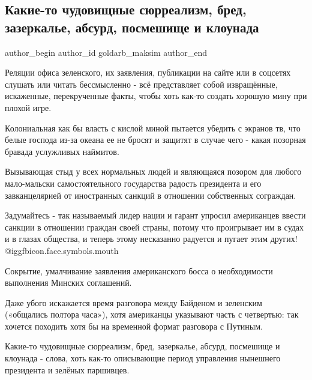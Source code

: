  
 
 
 
 
 
\subsection{Какие-то чудовищные сюрреализм, бред, зазеркалье, абсурд, посмешище и клоунада}
\label{sec:10_12_2021.fb.goldarb_maksim.1.klounada_sjurrealizm}
 
\ifcmt
 author_begin
   author_id goldarb_maksim
 author_end
\fi

Реляции офиса зеленского, их заявления, публикации на сайте или в соцсетях
слушать или читать бессмысленно - всё представляет собой извращённые,
искаженные, перекрученные факты, чтобы хоть как-то создать хорошую мину при
плохой игре. 


Колониальная как бы власть с кислой миной пытается убедить с экранов тв, что
белые господа из-за океана ее не бросят и защитят в случае чего - какая
позорная бравада услужливых наймитов. 

Вызывающая стыд у всех нормальных людей и являющаяся позором для любого
мало-мальски самостоятельного государства  радость президента и его
завканцелярией от иностранных санкций в отношении собственных сограждан. 

Задумайтесь - так называемый лидер нации и гарант упросил американцев ввести
санкции в отношении граждан своей страны, потому что проигрывает им в судах и в
глазах общества, и теперь этому несказанно радуется и пугает этим других!  @igg{fbicon.face.symbols.mouth} 

Сокрытие, умалчивание заявления американского босса о необходимости выполнения
Минских соглашений. 

Даже убого искажается время разговора между Байденом и зеленским («общались
полтора часа»), хотя американцы указывают часть с четвертью: так хочется
походить хотя бы на временной формат разговора с Путиным. 

Какие-то чудовищные сюрреализм, бред, зазеркалье, абсурд, посмешище и клоунада
- слова, хоть как-то описывающие период управления нынешнего президента и
зелёных паршивцев.
